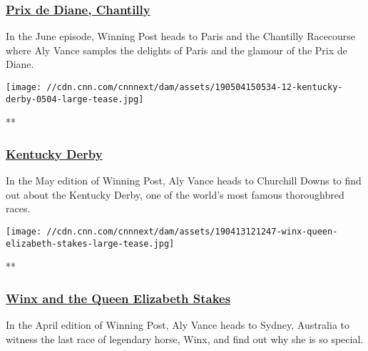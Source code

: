\hypertarget{prix-de-diane-chantilly}{%
\subsubsection{\texorpdfstring{\href{/videos/sports/2019/10/30/prix-de-diane-chantilly-racecourse-elegance-winning-post-food-vision-spt-intl.cnn}{Prix
de Diane,
Chantilly}}{Prix de Diane, Chantilly}}\label{prix-de-diane-chantilly}}

In the June episode, Winning Post heads to Paris and the Chantilly
Racecourse where Aly Vance samples the delights of Paris and the glamour
of the Prix de Diane.

\href{/videos/sports/2019/10/31/kentucky-derby-churchill-downs-most-exciting-two-minutes-winning-post-vision-spt-intl.cnn}{}

\texttt{[image: //cdn.cnn.com/cnnnext/dam/assets/190504150534-12-kentucky-derby-0504-large-tease.jpg]}

**

\hypertarget{kentucky-derby}{%
\subsubsection{\texorpdfstring{\href{/videos/sports/2019/10/31/kentucky-derby-churchill-downs-most-exciting-two-minutes-winning-post-vision-spt-intl.cnn}{Kentucky
Derby}}{Kentucky Derby}}\label{kentucky-derby}}

In the May edition of Winning Post, Aly Vance heads to Churchill Downs
to find out about the Kentucky Derby, one of the world's most famous
thoroughbred races.

\href{/videos/sports/2019/11/21/queen-elizabeth-stakes-australia-winx-last-race-winning-post-vision-spt-intl.cnn}{}

\texttt{[image: //cdn.cnn.com/cnnnext/dam/assets/190413121247-winx-queen-elizabeth-stakes-large-tease.jpg]}

**

\hypertarget{winx-and-the-queen-elizabeth-stakes}{%
\subsubsection{\texorpdfstring{\href{/videos/sports/2019/11/21/queen-elizabeth-stakes-australia-winx-last-race-winning-post-vision-spt-intl.cnn}{Winx
and the Queen Elizabeth
Stakes}}{Winx and the Queen Elizabeth Stakes}}\label{winx-and-the-queen-elizabeth-stakes}}

In the April edition of Winning Post, Aly Vance heads to Sydney,
Australia to witness the last race of legendary horse, Winx, and find
out why she is so special.

